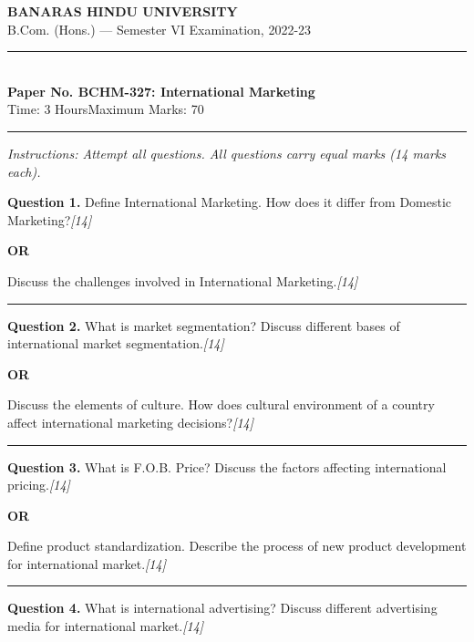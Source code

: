 \documentclass[11pt,a4paper]{article}
\newcommand{\pts}[1]{\hfill   \textit{[#1]}}
\begin{document}
\begin{center}
  {\large\bfseries BANARAS HINDU UNIVERSITY}\\[2pt]
  {\normalsize B.Com. (Hons.) --- Semester VI Examination, 2022-23}\\[6pt]
  \rule{0.8\linewidth}{0.5pt}\\[6pt]
  {\large\bfseries Paper No. BCHM-327: International Marketing}\\[4pt]
  {\normalsize Time: 3 Hours\hfill Maximum Marks: 70}
\end{center}

\rule{\linewidth}{0.4pt}

\smallskip



\noindent   \textit{Instructions: Attempt all questions. All questions carry equal marks (14 marks each).}

\bigskip




\noindent   \textbf{Question 1.}
Define International Marketing. How does it differ from Domestic Marketing?\pts{14}

\centerline{   \textbf{OR}}

Discuss the challenges involved in International Marketing.\pts{14}

\medskip\rule{\linewidth}{0.2pt}




\noindent   \textbf{Question 2.}
What is market segmentation? Discuss different bases of international market segmentation.\pts{14}

\centerline{   \textbf{OR}}

Discuss the elements of culture. How does cultural environment of a country affect international marketing decisions?\pts{14}

\medskip\rule{\linewidth}{0.2pt}




\noindent   \textbf{Question 3.}
What is F.O.B. Price? Discuss the factors affecting international pricing.\pts{14}

\centerline{   \textbf{OR}}

Define product standardization. Describe the process of new product development for international market.\pts{14}

\medskip\rule{\linewidth}{0.2pt}




\noindent   \textbf{Question 4.}
What is international advertising? Discuss different advertising media for international market.\pts{14}
\end{document}
